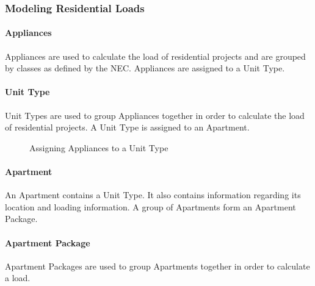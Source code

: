 \documentclass[letterpaper,10pt,english]{sphinxmanual}
\begin{document}
\subsubsection{Modeling Residential Loads}
\label{\detokenize{docs/userguide/definingarchitecturalelements/archelements/index-arch-elements:modeling-residential-loads}}

\paragraph{Appliances}
\label{\detokenize{docs/userguide/definingarchitecturalelements/archelements/index-arch-elements:appliances}}
Appliances are used to calculate the load of residential projects and are grouped by classes as defined by the NEC.  Appliances are assigned to a Unit Type.


\paragraph{Unit Type}
\label{\detokenize{docs/userguide/definingarchitecturalelements/archelements/index-arch-elements:unit-type}}
Unit Types are used to group Appliances together in order to calculate the load of residential projects.  A Unit Type is assigned to an Apartment.

\begin{figure}[H]
\centering
\capstart

\noindent{}
\caption{Assigning Appliances to a Unit Type}\label{\detokenize{docs/userguide/definingarchitecturalelements/archelements/index-arch-elements:id11}}\end{figure}


\paragraph{Apartment}
\label{\detokenize{docs/userguide/definingarchitecturalelements/archelements/index-arch-elements:apartment}}
An Apartment contains a Unit Type.  It also contains information regarding its location and loading information.  A group of Apartments form an Apartment Package.


\paragraph{Apartment Package}
\label{\detokenize{docs/userguide/definingarchitecturalelements/archelements/index-arch-elements:apartment-package}}
Apartment Packages are used to group Apartments together in order to calculate a load.
\end{document}
